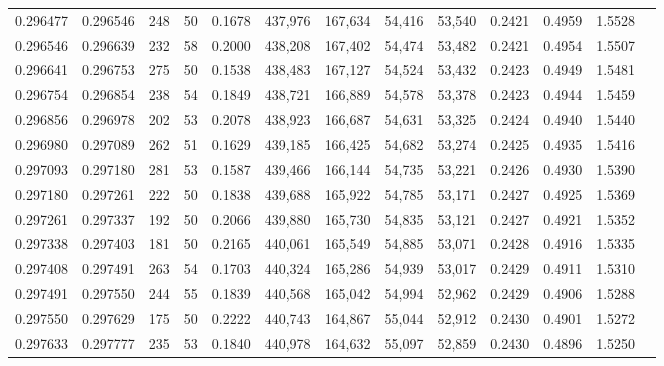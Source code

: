 \begin{tabular}{rrrrrrrrrrrrr}
0.296477 & 0.296546 &   248 &  50 &                                     0.1678 & 437,976 & 167,634 &  54,416 &  53,540 & 0.2421 & 0.4959 & 1.5528 \\
0.296546 & 0.296639 &   232 &  58 &                                     0.2000 & 438,208 & 167,402 &  54,474 &  53,482 & 0.2421 & 0.4954 & 1.5507 \\
0.296641 & 0.296753 &   275 &  50 &                                     0.1538 & 438,483 & 167,127 &  54,524 &  53,432 & 0.2423 & 0.4949 & 1.5481 \\
0.296754 & 0.296854 &   238 &  54 &                                     0.1849 & 438,721 & 166,889 &  54,578 &  53,378 & 0.2423 & 0.4944 & 1.5459 \\
0.296856 & 0.296978 &   202 &  53 &                                     0.2078 & 438,923 & 166,687 &  54,631 &  53,325 & 0.2424 & 0.4940 & 1.5440 \\
0.296980 & 0.297089 &   262 &  51 &                                     0.1629 & 439,185 & 166,425 &  54,682 &  53,274 & 0.2425 & 0.4935 & 1.5416 \\
0.297093 & 0.297180 &   281 &  53 &                                     0.1587 & 439,466 & 166,144 &  54,735 &  53,221 & 0.2426 & 0.4930 & 1.5390 \\
0.297180 & 0.297261 &   222 &  50 &                                     0.1838 & 439,688 & 165,922 &  54,785 &  53,171 & 0.2427 & 0.4925 & 1.5369 \\
0.297261 & 0.297337 &   192 &  50 &                                     0.2066 & 439,880 & 165,730 &  54,835 &  53,121 & 0.2427 & 0.4921 & 1.5352 \\
0.297338 & 0.297403 &   181 &  50 &                                     0.2165 & 440,061 & 165,549 &  54,885 &  53,071 & 0.2428 & 0.4916 & 1.5335 \\
0.297408 & 0.297491 &   263 &  54 &                                     0.1703 & 440,324 & 165,286 &  54,939 &  53,017 & 0.2429 & 0.4911 & 1.5310 \\
0.297491 & 0.297550 &   244 &  55 &                                     0.1839 & 440,568 & 165,042 &  54,994 &  52,962 & 0.2429 & 0.4906 & 1.5288 \\
0.297550 & 0.297629 &   175 &  50 &                                     0.2222 & 440,743 & 164,867 &  55,044 &  52,912 & 0.2430 & 0.4901 & 1.5272 \\
0.297633 & 0.297777 &   235 &  53 &                                     0.1840 & 440,978 & 164,632 &  55,097 &  52,859 & 0.2430 & 0.4896 & 1.5250 \\

\end{tabular}
